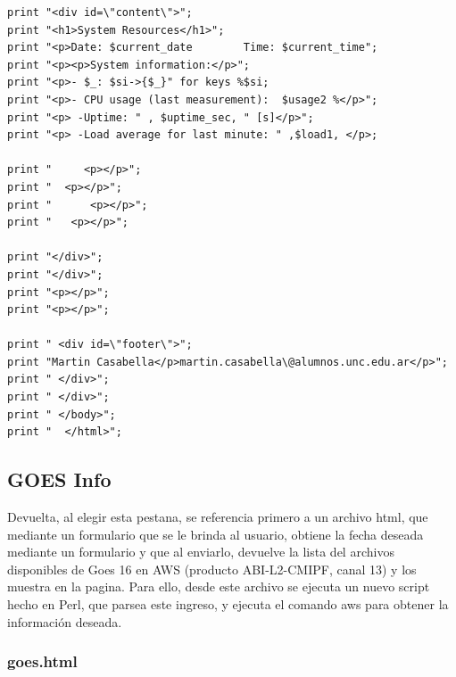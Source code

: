 \documentclass{article}
\begin{document}
\begin{lstlisting}[style=PerlStyle]
print "<div id=\"content\">";
print "<h1>System Resources</h1>";
print "<p>Date: $current_date        Time: $current_time";
print "<p><p>System information:</p>";
print "<p>- $_: $si->{$_}" for keys %$si;
print "<p>- CPU usage (last measurement):  $usage2 %</p>";
print "<p> -Uptime: " , $uptime_sec, " [s]</p>";
print "<p> -Load average for last minute: " ,$load1, </p>;

print "     <p></p>";
print "  <p></p>";
print "      <p></p>";
print "   <p></p>";

print "</div>";
print "</div>";
print "<p></p>";
print "<p></p>";

print " <div id=\"footer\">";
print "Martin Casabella</p>martin.casabella\@alumnos.unc.edu.ar</p>";
print " </div>";
print " </div>";
print " </body>";
print "  </html>";

\end{lstlisting}
\subsection{GOES Info}
Devuelta, al elegir esta pestana, se referencia primero a un archivo html, que mediante un formulario que se le brinda al usuario, obtiene la fecha deseada  mediante un formulario
y que al enviarlo, devuelve la lista del archivos disponibles de Goes 16 en AWS (producto ABI-L2-CMIPF, canal 13) y  los muestra en la pagina. Para ello, desde este archivo
se ejecuta un nuevo script hecho en Perl, que parsea este ingreso, y ejecuta el comando aws para obtener la información deseada.\\

\subsubsection{goes.html}

   
\end{document}
